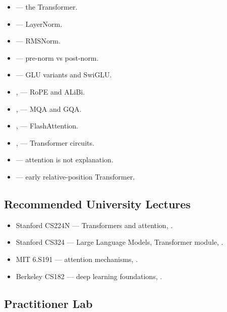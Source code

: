 \begin{itemize}
  \item \citet{vaswani2017attention} --- the Transformer.
  \item \citet{ba2016layernorm} --- LayerNorm.
  \item \citet{zhang2019rmsnorm} --- RMSNorm.
  \item \citet{xiong2020onlayer} --- pre-norm vs post-norm.
  \item \citet{shazeer2020glu} --- GLU variants and SwiGLU.
  \item \citet{su2021rope}, \citet{press2022alibi} --- RoPE and ALiBi.
  \item \citet{shazeer2019fast}, \citet{ainslie2023gqa} --- MQA and
        GQA.
  \item \citet{dao2022flashattention}, \citet{dao2023flashattention2}
        --- FlashAttention.
  \item \citet{elhage2021mathematical},
        \citet{olsson2022induction} --- Transformer circuits.
  \item \citet{jain2019attention} --- attention is not explanation.
  \item \citet{shaw2018relative} --- early relative-position
        Transformer.
\end{itemize}

\subsection{Recommended University Lectures}

\begin{itemize}
  \item Stanford CS224N --- Transformers and attention,
        \citet{stanford_cs224n}.
  \item Stanford CS324 --- Large Language Models, Transformer module,
        \citet{stanford_cs324}.
  \item MIT 6.S191 --- attention mechanisms, \citet{mit_6s191}.
  \item Berkeley CS182 --- deep learning foundations,
        \citet{berkeley_cs182}.
\end{itemize}

\subsection{Practitioner Lab}

